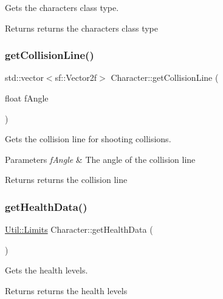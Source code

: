 Gets the characters class type. 

\begin{DoxyReturn}{Returns}
returns the characters class type 
\end{DoxyReturn}
\mbox{\label{class_character_ac74c4792b54211057448be3e5de5c8cc}} 
\subsubsection{\texorpdfstring{get\+Collision\+Line()}{getCollisionLine()}}
{\footnotesize\ttfamily std\+::vector$<$sf\+::\+Vector2f$>$ Character\+::get\+Collision\+Line (\begin{DoxyParamCaption}\item[{float}]{f\+Angle }\end{DoxyParamCaption})}



Gets the collision line for shooting collisions. 


\begin{DoxyParams}{Parameters}
{\em f\+Angle} & The angle of the collision line \\
\hline
\end{DoxyParams}
\begin{DoxyReturn}{Returns}
returns the collision line 
\end{DoxyReturn}
\mbox{\label{class_character_ac1985a83e63950e7ac87ce69ea28684f}} 
\subsubsection{\texorpdfstring{get\+Health\+Data()}{getHealthData()}}
{\footnotesize\ttfamily \hyperlink{struct_util_1_1_limits}{Util\+::\+Limits} Character\+::get\+Health\+Data (\begin{DoxyParamCaption}{ }\end{DoxyParamCaption})}



Gets the health levels. 

\begin{DoxyReturn}{Returns}
returns the health levels 
\end{DoxyReturn}
\mbox{\label{class_character_ac1ba1ec695a358e504aefdbd8b4b2552}} 
